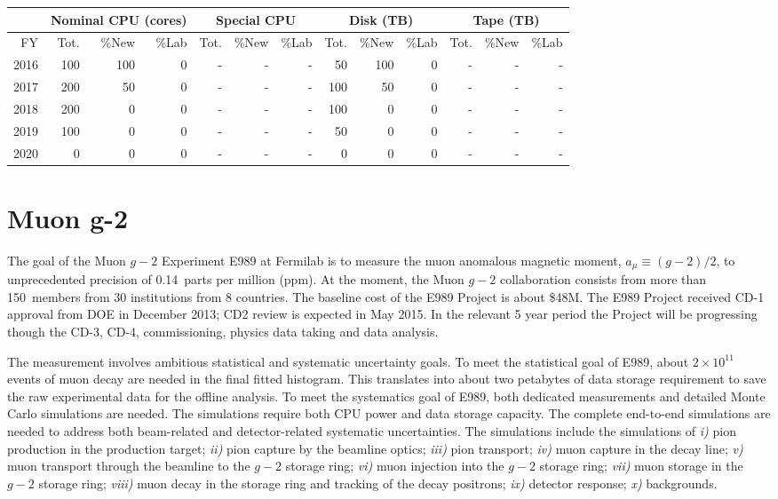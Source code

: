 \documentclass[pdftex,12pt,letter]{article}
\begin{document}
\begin{tabular}[h]{|r || r|r|r || r|r|r || r|r|r || r|r|r ||}
  \hline
   & \multicolumn{3}{c||}{Nominal CPU (cores)} & \multicolumn{3}{c||}{Special CPU} & \multicolumn{3}{c||}{Disk (TB)} & \multicolumn{3}{c||}{Tape (TB)} \\
   \hline
  FY & Tot. & \%New & \%Lab & Tot. & \%New & \%Lab & Tot. & \%New & \%Lab & Tot. & \%New & \%Lab \\
  \hline
  2016 &100 &100 &  0  &- & - & - &50 &100 & 0 &- & - & - \\
  \hline
  2017 &200 &50  &  0  &- & - & - &100 &50 & 0 &- & - & - \\
  \hline
  2018 &200 &0   &  0  &- & - & - &100 & 0 & 0 &- & - & - \\
  \hline
  2019 &100 &0   &  0  &- & - & - & 50 & 0 & 0 &- & - & - \\
  \hline
  2020 &0   &0   &  0  &- & - & - &  0 & 0 & 0 &- & - & - \\
  \hline
\end{tabular}

\pagebreak
\section{Muon g-2}

The goal of the Muon $g-2$ Experiment E989 at Fermilab is to measure
the muon anomalous magnetic moment, $a_\mu \equiv (g-2)/2$, to
unprecedented precision of 0.14~parts per million (ppm).
At the moment, the Muon $g-2$ collaboration consists from more than
150~members from 30 institutions from 8 countries. 
The baseline cost of the E989 Project is about \$48M.
The E989 Project received CD-1 approval from DOE in December 2013; CD2
review is expected in May 2015. 
In the relevant 5 year period the Project will be progressing though
the CD-3, CD-4, commissioning, physics data taking and data analysis.  

The measurement involves ambitious statistical and systematic
uncertainty goals. 
To meet the statistical goal of E989, about $2\times 10^{11}$ events
of muon decay are needed in the final fitted histogram. 
This translates into about two petabytes of data storage requirement
to save the raw experimental data for the offline analysis. 
To meet the systematics goal of E989, both dedicated measurements and
detailed Monte Carlo simulations are needed. 
The simulations require both CPU power and data storage capacity.  
The complete end-to-end simulations are needed to address both
beam-related and detector-related systematic uncertainties. 
The simulations include the simulations of
%
{\em i)} pion production in the production target; 
{\em ii)} pion capture by the beamline optics; 
{\em iii)} pion transport; 
{\em iv)} muon capture in the decay line;
{\em v)} muon transport through the beamline to the $g-2$ storage ring; 
{\em vi)} muon injection into the $g-2$ storage ring;
{\em vii)} muon storage in the $g-2$ storage ring; 
{\em viii)} muon decay in the storage ring and tracking of the decay positrons; 
{\em ix)} detector response; 
{\em x)} backgrounds. 
\end{document}
